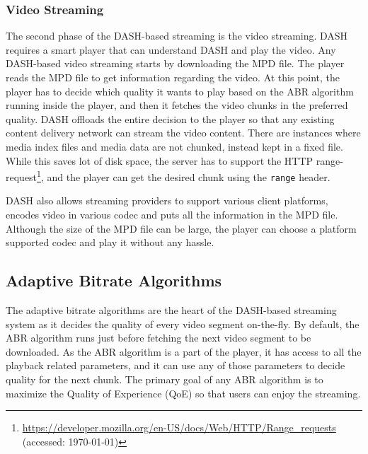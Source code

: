 \subsubsection{Video Streaming}
The second phase of the DASH-based streaming is the video streaming. DASH requires a smart player that can understand DASH and play the video. Any DASH-based video streaming starts by downloading the MPD file. The player reads the MPD file to get information regarding the video.  At this point, the player has to decide which quality it wants to play based on the ABR algorithm running inside the player, and then it fetches the video chunks in the preferred quality. DASH offloads the entire decision to the player so that any existing content delivery network can stream the video content. There are instances where media index files and media data are not chunked, instead kept in a fixed file. While this saves lot of disk space, the server has to support the HTTP range-request\footnote{\url{https://developer.mozilla.org/en-US/docs/Web/HTTP/Range_requests} (accessed: \today)}, and the player can get the desired chunk using the {\tt range} header.

DASH also allows streaming providers to support various client platforms, encodes video in various codec and puts all the information in the MPD file. Although the size of the MPD file can be large, the player can choose a platform supported codec and play it without any hassle.


\subsection{Adaptive Bitrate Algorithms}
The adaptive bitrate algorithms are the heart of the DASH-based streaming system as it decides the quality of every video segment on-the-fly. By default, the ABR algorithm runs just before fetching the next video segment to be downloaded. As the ABR algorithm is a part of the player, it has access to all the playback related parameters, and it can use any of those parameters to decide quality for the next chunk. The primary goal of any ABR algorithm is to maximize the Quality of Experience (QoE) so that users can enjoy the streaming.

